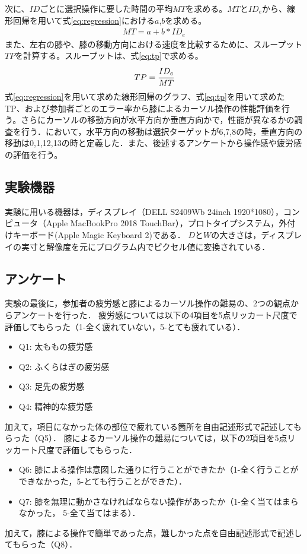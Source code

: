 \documentclass[submit, techrep]{ipsj}
\begin{document}
次に、$ID$ごとに選択操作に要した時間の平均$MT$を求める。$MT$と$ID_e$から、線形回帰を用いて式\ref{eq:regression}における$a$,$b$を求める。
\begin{eqnarray}
	MT = a + b * ID_e
	\label{eq:regression}
\end{eqnarray}
また、左右の膝や、膝の移動方向における速度を比較するために、スループット$TP$を計算する。スループットは、式\ref{eq:tp}で求める。
\begin{eqnarray}
	TP = \cfrac{ID_e}{MT}
	\label{eq:tp}
\end{eqnarray}
式\ref{eq:regression}を用いて求めた線形回帰のグラフ、式\ref{eq:tp}を用いて求めたTP、および参加者ごとのエラー率から膝によるカーソル操作の性能評価を行う。さらにカーソルの移動方向が水平方向か垂直方向かで，性能が異なるかの調査を行う．において，水平方向の移動は選択ターゲットが6,7,8の時，垂直方向の移動は0,1,12,13の時と定義した．また、後述するアンケートから操作感や疲労感の評価を行う。

\subsection{実験機器}
実験に用いる機器は，ディスプレイ（DELL S2409Wb 24inch 1920*1080），コンピュータ（Apple MacBookPro 2018 TouchBar），プロトタイプシステム，外付けキーボード(Apple Magic Keyboard 2)である．
$D$と$W$の大きさは，ディスプレイの実寸と解像度を元にプログラム内でピクセル値に変換されている．
\subsection{アンケート}
実験の最後に，参加者の疲労感と膝によるカーソル操作の難易の、2つの観点からアンケートを行った．
疲労感については以下の4項目を5点リッカート尺度で評価してもらった（1-全く疲れていない，5-とても疲れている）．
\begin{itemize}
	\item {Q1: }太ももの疲労感
	\item {Q2: }ふくらはぎの疲労感
	\item {Q3: }足先の疲労感
	\item {Q4: }精神的な疲労感
\end{itemize}
加えて，項目になかった体の部位で疲れている箇所を自由記述形式で記述してもらった（Q5）．
膝によるカーソル操作の難易については，以下の2項目を5点リッカート尺度で評価してもらった．
\begin{itemize}
	\item {Q6: }膝による操作は意図した通りに行うことができたか（1-全く行うことができなかった，5-とても行うことができた）．
	\item {Q7: }膝を無理に動かさなければならない操作があったか（1-全く当てはまらなかった， 5-全て当てはまる）．
\end{itemize}
加えて，膝による操作で簡単であった点，難しかった点を自由記述形式で記述してもらった（Q8）．
\end{document}
